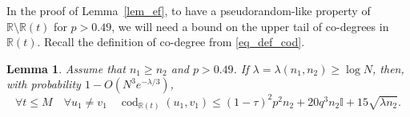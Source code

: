 \documentclass[12pt,reqno]{amsart}
\newcommand{\R} {\mathbb R}
\newcommand{\I} {\mathbb I}
\newcommand{\cod}{\operatorname{cod}}
\newtheorem{lemma}[theorem]{Lemma}
\theoremstyle{definition}
\begin{document}
In the proof of Lemma~\ref{lem_ef}, to have a pseudorandom-like property of $\R \setminus \R(t)$ for $p > 0.49$, we will need a bound on the upper tail of co-degrees in $\R(t)$. Recall the definition of co-degree from \eqref{eq_def_cod}.



\newcommand{\constcodegsRt}{15}
\begin{lemma}
	\label{lem_codegsRt}
	Assume that $n_1 \ge n_2$ and $p > 0.49$.
	If $\lambda = \lambda(n_1,n_2) \ge \log N$, then,  with probability $1 - O(N^3e^{-\lambda/3 })$,
	\begin{equation}
		\label{eq_codegsRt}
		\forall t \le M \quad \forall u_1 \neq v_1 \quad\cod_{\R(t)}(u_1,v_1) \le(1 - \tau)^2p^2 n_{2} + 20 q^3n_2\I + \constcodegsRt\sqrt{\lambda n_{2}}.
	\end{equation}
\end{lemma}
\end{document}
